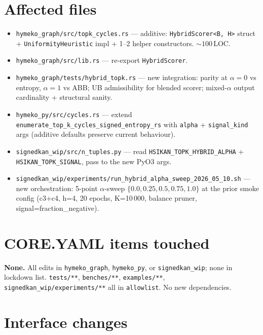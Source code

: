 \documentclass[a4paper,11pt]{article}
\begin{document}
\section*{Affected files}

\begin{itemize}
  \item \texttt{hymeko\_graph/src/topk\_cycles.rs} — additive:
    \texttt{HybridScorer<B, H>} struct + \texttt{UniformityHeuristic}
    impl + 1--2 helper constructors.  $\sim 100$\,LOC.
  \item \texttt{hymeko\_graph/src/lib.rs} — re-export
    \texttt{HybridScorer}.
  \item \texttt{hymeko\_graph/tests/hybrid\_topk.rs} — new
    integration: parity at $\alpha{=}0$ vs entropy, $\alpha{=}1$ vs
    ABB; UB admissibility for blended scorer; mixed-$\alpha$ output
    cardinality + structural sanity.
  \item \texttt{hymeko\_py/src/cycles.rs} — extend
    \texttt{enumerate\_top\_k\_cycles\_signed\_entropy\_rs} with
    \texttt{alpha} + \texttt{signal\_kind} args (additive defaults
    preserve current behaviour).
  \item \texttt{signedkan\_wip/src/n\_tuples.py} — read
    \texttt{HSIKAN\_TOPK\_HYBRID\_ALPHA} +
    \texttt{HSIKAN\_TOPK\_SIGNAL}, pass to the new PyO3 args.
  \item \texttt{signedkan\_wip/experiments/run\_hybrid\_alpha\_sweep\_2026\_05\_10.sh}
    — new orchestration: 5-point $\alpha$-sweep
    $\{0.0, 0.25, 0.5, 0.75, 1.0\}$ at the prior smoke config (c3+c4,
    h=4, 20 epochs, K=10\,000, balance pruner, signal=fraction\_negative).
\end{itemize}

\section*{CORE.YAML items touched}

\textbf{None.}  All edits in \texttt{hymeko\_graph}, \texttt{hymeko\_py},
or \texttt{signedkan\_wip}; none in
lockdown list. \texttt{tests/**}, \texttt{benches/**},
\texttt{examples/**}, \texttt{signedkan\_wip/experiments/**} all in
\texttt{allowlist}. No new dependencies.

\section*{Interface changes}
\end{document}
